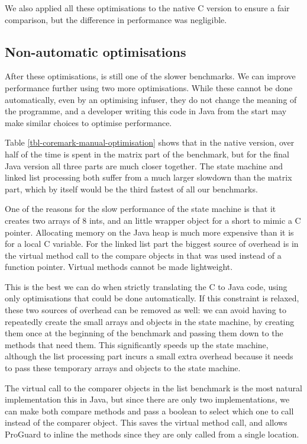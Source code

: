 We also applied all these optimisations to the native C version to ensure a fair comparison, but the difference in performance was negligible.

\subsection{Non-automatic optimisations}
\label{sec-evaluation-coremark-non-automatic-optimisations}
After these optimisations,  is still one of the slower benchmarks. We can improve performance further using two more optimisations. While these cannot be done automatically, even by an optimising infuser, they do not change the meaning of the programme, and a developer writing this code in Java from the start may make similar choices to optimise performance.

Table \ref{tbl-coremark-manual-optimisation} shows that in the native version, over half of the time is spent in the matrix part of the benchmark, but for the final Java version all three parts are much closer together. The state machine and linked list processing both suffer from a much larger slowdown than the matrix part, which by itself would be the third fastest of all our benchmarks.

One of the reasons for the slow performance of the state machine is that it creates two arrays of 8 ints, and an little wrapper object for a short to mimic a C pointer. Allocating memory on the Java heap is much more expensive than it is for a local C variable. For the linked list part the biggest source of overhead is in the virtual method call to the compare objects in  that was used instead of a function pointer. Virtual methods cannot be made lightweight.

This is the best we can do when strictly translating the C to Java code, using only optimisations that could be done automatically. If this constraint is relaxed, these two sources of overhead can be removed as well: we can avoid having to repeatedly create the small arrays and objects in the state machine, by creating them once at the beginning of the benchmark and passing them down to the methods that need them. This significantly speeds up the state machine, although the list processing part incurs a small extra overhead because it needs to pass these temporary arrays and objects to the state machine.

The virtual call to the comparer objects in the list benchmark is the most natural implementation this in Java, but since there are only two implementations, we can make both compare methods  and pass a boolean to select which one to call instead of the comparer object. This saves the virtual method call, and allows ProGuard to inline the methods since they are only called from a single location.

